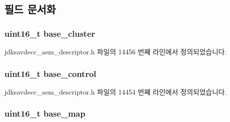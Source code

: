 \subsection{필드 문서화}
\subsubsection[{\texorpdfstring{base\+\_\+cluster}{base_cluster}}]{\setlength{\rightskip}{0pt plus 5cm}uint16\+\_\+t base\+\_\+cluster}\hypertarget{structjdksavdecc__descriptor__stream__port_a27affef7a010ca4446501e50e8d4bc92}{}\label{structjdksavdecc__descriptor__stream__port_a27affef7a010ca4446501e50e8d4bc92}


jdksavdecc\+\_\+aem\+\_\+descriptor.\+h 파일의 14456 번째 라인에서 정의되었습니다.

\subsubsection[{\texorpdfstring{base\+\_\+control}{base_control}}]{\setlength{\rightskip}{0pt plus 5cm}uint16\+\_\+t base\+\_\+control}\hypertarget{structjdksavdecc__descriptor__stream__port_af06eac7dd98377a85258308e8a25e7f2}{}\label{structjdksavdecc__descriptor__stream__port_af06eac7dd98377a85258308e8a25e7f2}


jdksavdecc\+\_\+aem\+\_\+descriptor.\+h 파일의 14454 번째 라인에서 정의되었습니다.

\subsubsection[{\texorpdfstring{base\+\_\+map}{base_map}}]{\setlength{\rightskip}{0pt plus 5cm}uint16\+\_\+t base\+\_\+map}\hypertarget{structjdksavdecc__descriptor__stream__port_ad71332cc282a2f8d6de8b12f56d8de28}{}\label{structjdksavdecc__descriptor__stream__port_ad71332cc282a2f8d6de8b12f56d8de28}


